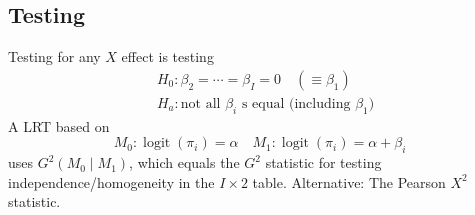\documentclass[11pt]{elegantbook}
\begin{document}
\subsection{Testing}
Testing for any $X$ effect is testing
$$
\begin{aligned}
& H_0: \beta_2=\cdots=\beta_I=0 \quad\left(\equiv \beta_1\right) \\
& H_a: \text {not all } \beta_i \text { s equal (including $\beta_1$)}
\end{aligned}
$$
A LRT based on
$$
M_0: \operatorname{logit}\left(\pi_i\right)=\alpha \quad M_1: \operatorname{logit}\left(\pi_i\right)=\alpha+\beta_i
$$
uses $G^2\left(M_0 \mid M_1\right)$, which equals the $G^2$ statistic for testing independence/homogeneity in the $I \times 2$ table.
Alternative: The Pearson $X^2$ statistic.
\end{document}
